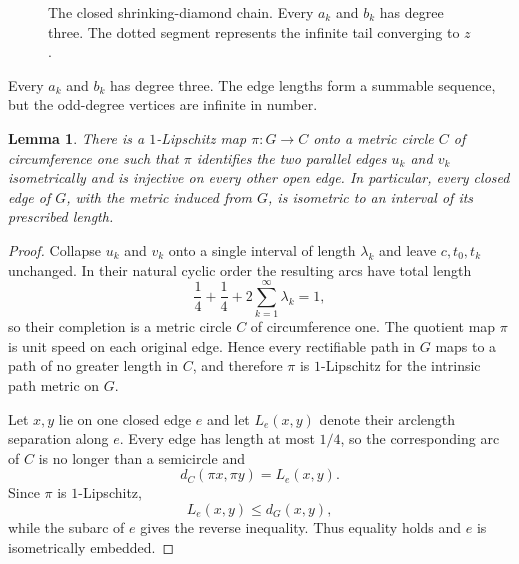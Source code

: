 \documentclass[11pt]{article}
\newtheorem{lemma}[theorem]{Lemma}
\theoremstyle{remark}
\newcommand{\N}{\mathbf N}
\begin{document}
\begin{figure}[t]
\centering
{}
\caption{The closed shrinking-diamond chain. Every $a_k$ and $b_k$ has degree three. The dotted segment represents the infinite tail converging to $z$.}
\label{fig:graph}
\end{figure}

Every $a_k$ and $b_k$ has degree three. The edge lengths form a summable sequence, but the odd-degree vertices are infinite in number.

\begin{lemma}\label{lem:quotient-circle}
There is a $1$-Lipschitz map $\pi:G\to C$ onto a metric circle $C$ of circumference one such that $\pi$ identifies the two parallel edges $u_k$ and $v_k$ isometrically and is injective on every other open edge. In particular, every closed edge of $G$, with the metric induced from $G$, is isometric to an interval of its prescribed length.
\end{lemma}

\begin{proof}
Collapse $u_k$ and $v_k$ onto a single interval of length $\lambda_k$ and leave $c,t_0,t_k$ unchanged. In their natural cyclic order the resulting arcs have total length
\[
  \frac14+\frac14+2\sum_{k=1}^\infty\lambda_k=1,
\]
so their completion is a metric circle $C$ of circumference one. The quotient map $\pi$ is unit speed on each original edge. Hence every rectifiable path in $G$ maps to a path of no greater length in $C$, and therefore $\pi$ is $1$-Lipschitz for the intrinsic path metric on $G$.

Let $x,y$ lie on one closed edge $e$ and let $L_e(x,y)$ denote their arclength separation along $e$. Every edge has length at most $1/4$, so the corresponding arc of $C$ is no longer than a semicircle and
\[
 d_C(\pi x,\pi y)=L_e(x,y).
\]
Since $\pi$ is $1$-Lipschitz,
\[
 L_e(x,y)\le d_G(x,y),
\]
while the subarc of $e$ gives the reverse inequality. Thus equality holds and $e$ is isometrically embedded.
\end{proof}
\end{document}
